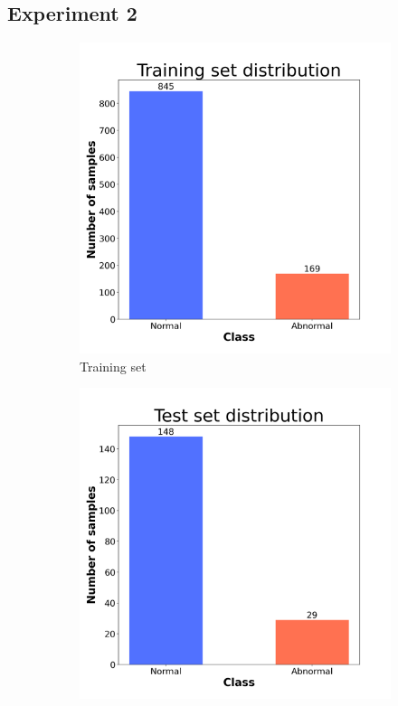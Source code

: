 \subsection*{Experiment 2}


\begin{figure}[H]
    \centering
    \begin{subfigure}[t]{0.45\textwidth}
        \centering
        \includegraphics[width=1\textwidth]{images/exper2/SP/train_dist.png}
        \caption{Training set}
    \end{subfigure}
    \begin{subfigure}[t]{0.45\textwidth}
        \centering
        \includegraphics[width=1\textwidth]{images/exper2/SP/test_dist.png}

\end{subfigure}
\end{figure}
